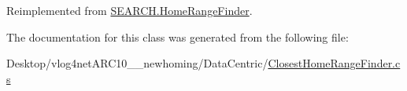 Reimplemented from \hyperlink{class_s_e_a_r_c_h_1_1_home_range_finder_a41b187329b1cd89b91c9c2f4a145ec7b}{S\-E\-A\-R\-C\-H.\-Home\-Range\-Finder}.



The documentation for this class was generated from the following file\-:\begin{DoxyCompactItemize}
\item 
Desktop/vlog4net\-A\-R\-C10\-\_\-\_\-newhoming/\-Data\-Centric/\hyperlink{_closest_home_range_finder_8cs}{Closest\-Home\-Range\-Finder.\-cs}\end{DoxyCompactItemize}
